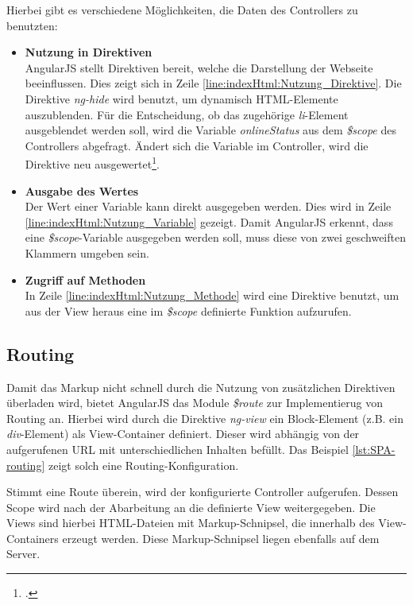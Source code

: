 Hierbei gibt es verschiedene Möglichkeiten, die Daten des Controllers zu benutzten: 
\begin{itemize}
\item \textbf{Nutzung in Direktiven}\\
AngularJS stellt Direktiven bereit, welche die Darstellung der Webseite beeinflussen. Dies zeigt sich in Zeile \ref{line:indexHtml:Nutzung_Direktive}. Die Direktive \textit{ng-hide} wird benutzt, um dynamisch \ac{HTML}-Elemente auszublenden. Für die Entscheidung, ob das zugehörige \textit{li}-Element ausgeblendet werden soll, wird die Variable \textit{onlineStatus} aus dem \textit{\$scope} des Controllers abgefragt. Ändert sich die Variable im Controller, wird die Direktive neu ausgewertet\footcite{online:angular:diretive}.
\item \textbf{Ausgabe des Wertes}\\
Der Wert einer Variable kann direkt ausgegeben werden. Dies wird in Zeile \ref{line:indexHtml:Nutzung_Variable} gezeigt. Damit AngularJS erkennt, dass eine \textit{\$scope}-Variable ausgegeben werden soll, muss diese von zwei geschweiften Klammern umgeben sein.
\item \textbf{Zugriff auf Methoden}\\
In Zeile \ref{line:indexHtml:Nutzung_Methode} wird eine Direktive benutzt, um aus der View heraus eine im \textit{\$scope} definierte Funktion aufzurufen.
\end{itemize}
\subsection{Routing}
\label{ssec:SPA-Routing}
Damit das \gls{Markup} nicht schnell durch die Nutzung von zusätzlichen Direktiven überladen wird, bietet AngularJS das Module \textit{\$route} zur Implementierug von Routing an. Hierbei wird durch die Direktive \textit{ng-view} ein Block-Element (z.B. ein \textit{div}-Element) als View-Container definiert. Dieser wird abhängig von der aufgerufenen URL mit unterschiedlichen Inhalten befüllt. Das Beispiel \ref{lst:SPA-routing} zeigt solch eine Routing-Konfiguration. 

Stimmt eine Route überein, wird der konfigurierte Controller aufgerufen. Dessen Scope wird nach der Abarbeitung an die definierte View weitergegeben. Die Views sind hierbei \ac{HTML}-Dateien mit \gls{Markup}-Schnipsel, die innerhalb des View-Containers erzeugt werden. Diese \gls{Markup}-Schnipsel liegen ebenfalls auf dem Server. 
